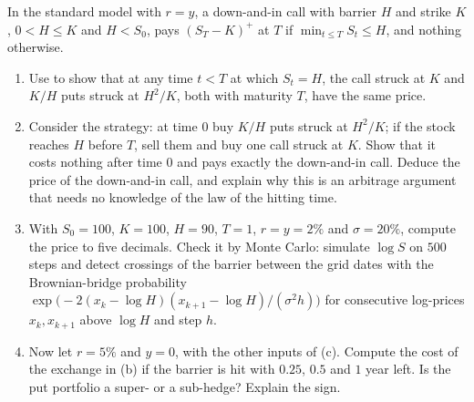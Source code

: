 \begin{exercise}\label{ex:sr-barrier}
\hard In the standard model with $r=y$, a down-and-in call with barrier $H$ and strike $K$, $0<H\le K$ and
$H<S_0$, pays $(S_T-K)^+$ at $T$ if $\min_{t\le T}S_t\le H$, and nothing otherwise.
\begin{enumerate}[label=(\alph*)]
  \item Use  to show that at any time $t<T$ at which $S_t=H$, the call struck at $K$ and $K/H$
    puts struck at $H^2/K$, both with maturity $T$, have the same price.
  \item Consider the strategy: at time $0$ buy $K/H$ puts struck at $H^2/K$; if the stock reaches $H$ before $T$,
    sell them and buy one call struck at $K$. Show that it costs nothing after time $0$ and pays exactly the
    down-and-in call. Deduce the price of the down-and-in call, and explain why this is an arbitrage argument
    that needs no knowledge of the law of the hitting time.
  \item With $S_0=100$, $K=100$, $H=90$, $T=1$, $r=y=2\%$ and $\sigma=20\%$, compute the price to five decimals.
    Check it by Monte Carlo: simulate $\log S$ on $500$ steps and detect crossings of the barrier between the
    grid dates with the Brownian-bridge probability $\exp\big(-2(x_k-\log H)(x_{k+1}-\log H)/(\sigma^2h)\big)$ for
    consecutive log-prices $x_k,x_{k+1}$ above $\log H$ and step $h$.
  \item Now let $r=5\%$ and $y=0$, with the other inputs of (c). Compute the cost of the exchange in (b) if the
    barrier is hit with $0.25$, $0.5$ and $1$ year left. Is the put portfolio a super- or a sub-hedge? Explain
    the sign.
\end{enumerate}
\end{exercise}
